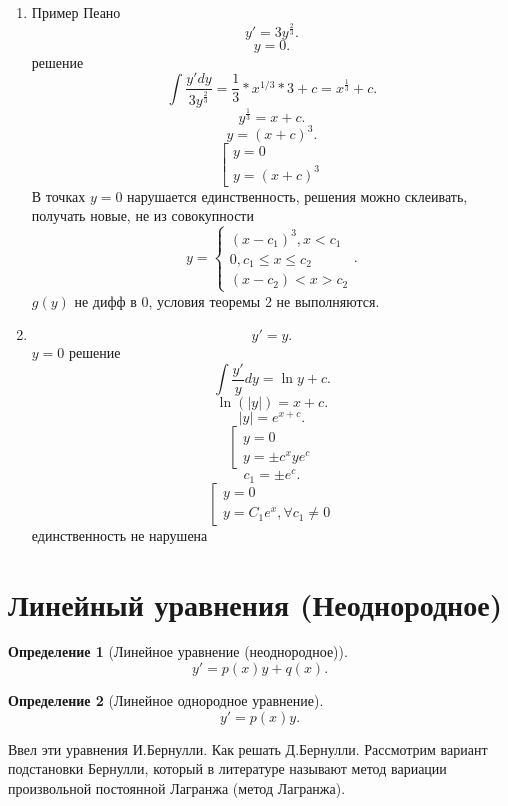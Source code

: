 \documentclass[14pt]{extarticle}
\newtheorem{definition}{Определение}
\begin{document}
\begin{enumerate}
	\item Пример Пеано
	      \[
		      y' = 3 y^{\frac{2}{3}}
		      .\]
	      \[
		      y = 0
		      .\]
	      решение
	      \[
		      \int \frac{y' dy}{3y^{\frac{2}{3}}} = \frac{1}{3} *x^{1/3} * 3 + c = x^{\frac{1}{3}} + c
		      .\]
	      \[
		      y^{\frac{1}{3}} = x + c
		      .\]
	      \[
		      y = (x + c)^{3}
		      .\]
	      \[
		      \left[
		      \begin{gathered}
			      y = 0\\
			      y = (x + c)^{3}
		      \end{gathered}
		      \right
		      .\]
	      В точках $y = 0$ нарушается единственность, решения можно склеивать, получать новые, не из совокупности
	      \[
		      y =
		      \begin{cases}
			      (x - c_1)^{3} ,x <  c_1 \\
			      0 , c_1 \le  x \le  c_2 \\
			      (x - c_2)< x > c_2
		      \end{cases}
		      .\]
	      $g(y)$ не дифф в 0, условия теоремы 2 не выполняются.
	\item
	      \[
		      y' = y
		      .\]
	      $y = 0$ решение
	      \[
		      \int \frac{y'}{y} dy = \ln{y} +  c
		      .\]
	      \[
		      \ln{(|y|)} = x + c
		      .\]
	      \[
		      |y| = e^{x + c}
		      .\]
	      \[
		      \left[
		      \begin{gathered}
			      y = 0\\
			      y = \pm c^{x}y e^{c}
		      \end{gathered}
		      \right
		      .\]
	      \[
		      c_1 = \pm e^{c}
		      .\]
	      \[
		      \left [
		      \begin{gathered}
			      y = 0\\
			      y = C_1 e^{x}, \forall  c_1 \neq 0
		      \end{gathered}
		      \right
		      .\]
	      единственность не нарушена
\end{enumerate}
\section{Линейный уравнения (Неоднородное)}
\begin{definition}[Линейное уравнение (неоднородное)]\label{lin}
	\[
		y' = p(x) y + q(x)
		.\]
\end{definition}
\begin{definition}[Линейное однородное уравнение]\label{odn}
	\[
		y' = p(x) y
		.\]
\end{definition}
Ввел эти уравнения И.Бернулли. Как решать Д.Бернулли.
Рассмотрим вариант подстановки Бернулли, который в литературе называют метод вариации произвольной постоянной Лагранжа (метод Лагранжа).
\end{document}
